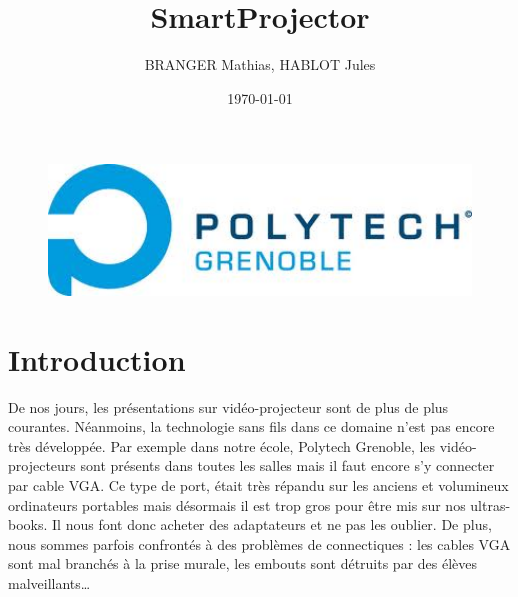 \documentclass[a4paper, 11pt]{article}
\title{\Huge{SmartProjector}}
\author{BRANGER Mathias, HABLOT Jules}
\date{\today}
\begin{document}
\maketitle

\begin{figure}
	\centering
	\includegraphics[width=1\textwidth]{polytech.jpg}
\end{figure}

\clearpage

\tableofcontents

\clearpage



\section{Introduction}

De nos jours, les présentations sur vidéo-projecteur sont de plus de plus courantes. Néanmoins, la technologie sans fils dans ce domaine n'est pas encore très développée. Par exemple dans notre école, Polytech Grenoble, les vidéo-projecteurs sont présents dans toutes les salles mais il faut encore s'y connecter par cable VGA. Ce type de port, était très répandu sur les anciens et volumineux ordinateurs portables mais désormais il est trop gros pour être mis sur nos ultras-books. Il nous font donc acheter des adaptateurs et ne pas les oublier. De plus, nous sommes parfois confrontés à des problèmes de connectiques : les cables VGA sont mal branchés à la prise murale, les embouts sont détruits par des élèves malveillants…
\end{document}
